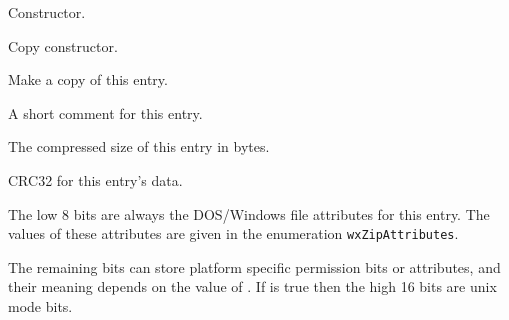 

\label{wxzipentrywxzipentry}


Constructor.


Copy constructor.


\label{wxzipentryclone}


Make a copy of this entry.


\label{wxzipentrycomment}



A short comment for this entry.


\label{wxzipentrygetcompressedsize}


The compressed size of this entry in bytes.


\label{wxzipentrygetcrc}


CRC32 for this entry's data.


\label{wxzipentryexternalattributes}



The low 8 bits are always the DOS/Windows file attributes for this entry.
The values of these attributes are given in the
enumeration {\tt wxZipAttributes}.

The remaining bits can store platform specific permission bits or
attributes, and their meaning depends on the value
of .
If  is true then the
high 16 bits are unix mode bits.

